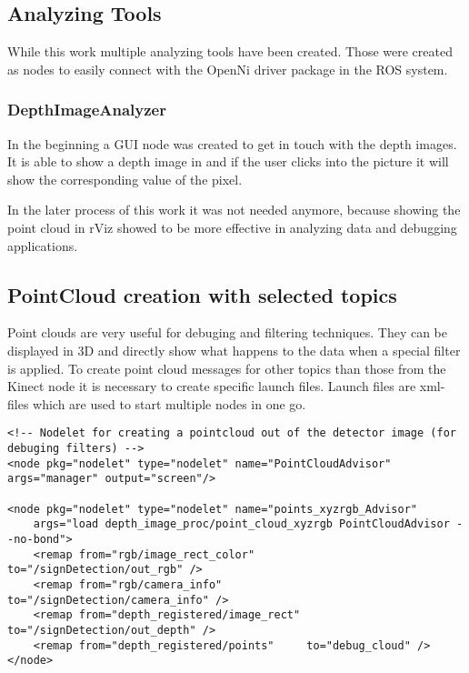 \subsection{Analyzing Tools}

While this work multiple analyzing tools have been created. Those were created as
nodes to easily connect with the OpenNi driver package in the ROS system.

\subsubsection{DepthImageAnalyzer}
In the beginning a GUI node was created to get in touch with the depth images.
It is able to show a depth image in and if the user clicks into the picture it
will show the corresponding value of the pixel.


In the later process of this work it was not needed anymore, because showing the point cloud
in rViz showed to be more effective in analyzing data and debugging applications.

\subsection{PointCloud creation with selected topics}
Point clouds are very useful for debuging and filtering techniques. They can be displayed in
3D and directly show what happens to the data when a special filter is applied.
To create point cloud messages for other topics than those from the Kinect node it is necessary to
create specific launch files. Launch files are xml-files which are used to start multiple nodes in one
go. 


{%
\tiny{}
\begin{lstlisting}
<!-- Nodelet for creating a pointcloud out of the detector image (for debuging filters) -->
<node pkg="nodelet" type="nodelet" name="PointCloudAdvisor" args="manager" output="screen"/>

<node pkg="nodelet" type="nodelet" name="points_xyzrgb_Advisor" 
	args="load depth_image_proc/point_cloud_xyzrgb PointCloudAdvisor --no-bond">
    <remap from="rgb/image_rect_color"        to="/signDetection/out_rgb" />
    <remap from="rgb/camera_info"             to="/signDetection/camera_info" />
    <remap from="depth_registered/image_rect" to="/signDetection/out_depth" />
    <remap from="depth_registered/points"     to="debug_cloud" />
</node>
\end{lstlisting}
}


